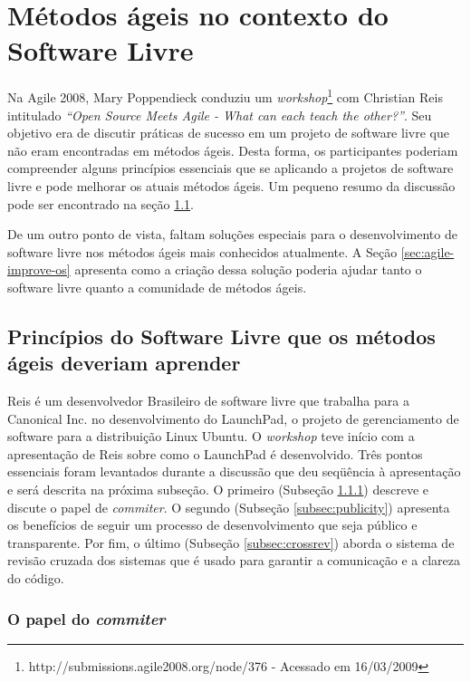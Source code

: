 \chapter{Métodos ágeis no contexto do Software Livre}
\label{cap:agile}

Na Agile 2008, Mary Poppendieck conduziu um
\emph{workshop}\footnote{http://submissions.agile2008.org/node/376 -
  Acessado em 16/03/2009} com Christian Reis intitulado \emph{``Open
  Source Meets Agile - What can each teach the other?''}. Seu objetivo
era de discutir práticas de sucesso em um projeto de software livre
que não eram encontradas em métodos ágeis. Desta forma, os
participantes poderiam compreender alguns princípios essenciais que se
aplicando a projetos de software livre e pode melhorar os atuais
métodos ágeis. Um pequeno resumo da discussão pode ser encontrado na
seção \ref{sec:foss-over-agile}.

De um outro ponto de vista, faltam soluções especiais para o
desenvolvimento de software livre nos métodos ágeis mais conhecidos
atualmente. A Seção \ref{sec:agile-improve-os} apresenta como a
criação dessa solução poderia ajudar tanto o software livre quanto a
comunidade de métodos ágeis.

\section{Princípios do Software Livre que os métodos ágeis deveriam
  aprender}
\label{sec:foss-over-agile}

Reis é um desenvolvedor Brasileiro de software livre que trabalha para
a Canonical Inc. no desenvolvimento do LaunchPad, o projeto de
gerenciamento de software para a distribuição Linux Ubuntu. O
\emph{workshop} teve início com a apresentação de Reis sobre como o
LaunchPad é desenvolvido. Três pontos essenciais foram levantados
durante a discussão que deu seqüência à apresentação e será descrita
na próxima subseção. O primeiro (Subseção \ref{subsec:commiter})
descreve e discute o papel de \emph{commiter}.%
O segundo (Subseção \ref{subsec:publicity}) apresenta os benefícios de
seguir um processo de desenvolvimento que seja público e transparente.
Por fim, o último (Subseção \ref{subsec:crossrev}) aborda o sistema de
revisão cruzada dos sistemas que é usado para garantir a comunicação e
a clareza do código.

\subsection{O papel do \emph{commiter}}
\label{subsec:commiter}

